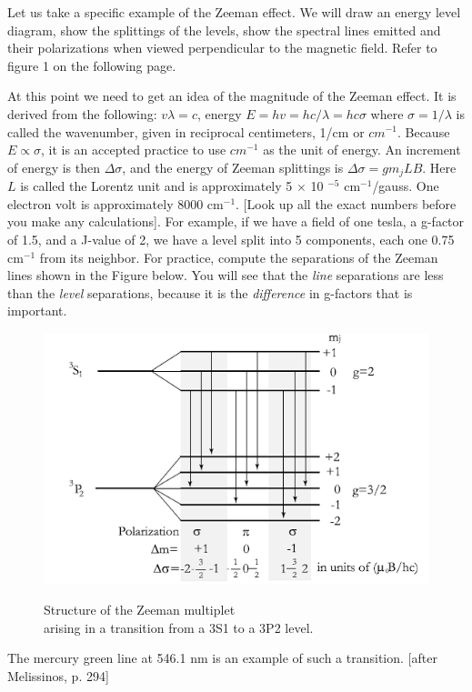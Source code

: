 \documentclass{../lab}
\begin{document}
Let us take a specific example of the Zeeman effect. We will draw an energy level diagram, show the splittings of the levels, show the spectral lines emitted and their polarizations when viewed perpendicular to the magnetic field. Refer to figure 1 on the following page.

At this point we need to get an idea of the magnitude of the Zeeman effect. It is derived from the following: $v \lambda = c$, energy $E = hv = hc / \lambda = hc \sigma$  where  $\sigma = 1 / \lambda$ is called the wavenumber, given in reciprocal centimeters, 1/cm or $cm^{-1}$. Because $E\propto\sigma$, it is an accepted practice to use $cm^{-1}$ as the unit of energy. An increment of energy is then $\Delta\sigma$, and the energy of Zeeman splittings is $\Delta\sigma = g m_j L B$. Here $L$ is called the Lorentz unit and is approximately 5 $\times$ 10 $^{-5}$ cm$^{-1}$/gauss. One electron volt is approximately 8000 cm$^{-1}$. [Look up all the exact numbers before you make any calculations]. For example, if we have a field of one tesla, a g-factor of 1.5, and a J-value of 2, we have a level split into 5 components, each one 0.75 cm$^{-1}$ from its neighbor. For practice, compute the separations of the Zeeman lines shown in the Figure below. You will see that the \emph{line} separations are less than the \emph{level} separations, because it is the \emph{difference} in g-factors that is important.

\begin{figure}[h]
    \centering
    \href{http://experimentationlab.berkeley.edu/sites/default/files/images/Atm1image003.gif}{\includegraphics[width=0.5\linewidth]{images/Atm1image003.png}}
    \caption{Structure of the Zeeman multiplet \\ arising in a transition from a 3S1 to a 3P2 level.}
    \label{fig:Atm1image003}
\end{figure}

The mercury green line at 546.1 nm is an example of such a transition. [after Melissinos, p. 294]

\newpage
\end{document}
